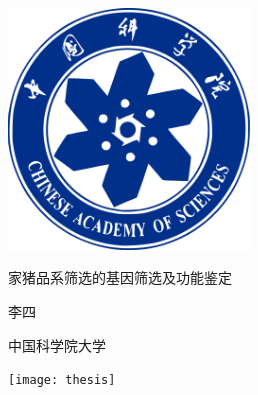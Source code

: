 \documentclass[zihao = -4]{ctexart}
\newlength{\colpad}
\newcommand{\colwidth}{\ccwd}
\newcommand{\miniwidth}{210mm}
\newcommand{\logowidth}{64mm}
\newcommand{\vertmargin}{30mm}
\begin{document}
\centering
\begin{minipage}[b][\textheight][b]{\miniwidth}
	\vspace*{\fill}\par
	\centerline{\includegraphics[width = \logowidth]{caslogo}}\par
	\vspace*{\fill}\par
\end{minipage}
\hspace{\colpad}
\begin{minipage}[b][\textheight][b]{\colwidth}
	\bfseries\linespread{1}\selectfont
	\vspace*{\vertmargin}\par
	家猪品系筛选的基因筛选及功能鉴定\par\vfill
	李四\par{\vfill}中国科学院大学\par
	\vspace*{\vertmargin}\par
\end{minipage}
\hspace{\colpad}
\begin{minipage}[b][\textheight][b]{\miniwidth}
	\texttt{[image: thesis]}
\end{minipage}
\end{document}

